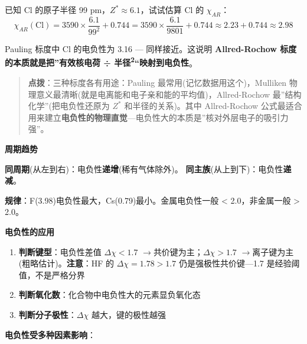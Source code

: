 \documentclass[a4paper,11pt]{ctexart}
\providecommand{\tightlist}{\setlength{\itemsep}{0pt}\setlength{\parskip}{0pt}}
\newcommand{\箭}{\ensuremath{\rightarrow}}
\newcommand{\左箭}{\ensuremath{\leftarrow}}
\newcommand{\上箭}{\ensuremath{\uparrow}}
\newcommand{\下箭}{\ensuremath{\downarrow}}
\newcommand{\衡}{\ensuremath{\rightleftharpoons}}
\newcommand{\双箭}{\ensuremath{\leftrightarrow}}
\newcommand{\约等于}{\ensuremath{\approx}}
\newcommand{\小于等于}{\ensuremath{\leq}}
\newcommand{\大于等于}{\ensuremath{\geq}}
\newcommand{\不等于}{\ensuremath{\neq}}
\newcommand{\西格马}{\ensuremath{\sigma}}
\newcommand{\派}{\ensuremath{\pi}}
\begin{document}
已知 Cl 的原子半径 99 pm，\(Z^* \approx 6.1\)，试试估算 Cl 的 \(\chi_{AR}\)：
\[\chi_{AR}(\mathrm{Cl}) = 3590 \times \frac{6.1}{99^2} + 0.744 = 3590 \times \frac{6.1}{9801} + 0.744 \approx 2.23 + 0.744 \approx 2.98\]

Pauling 标度中 Cl 的电负性为 3.16 --- 同样接近。这说明 \textbf{Allred-Rochow 标度的本质就是把''有效核电荷 ÷ 半径\textsuperscript{2}``映射到电负性}。

\begin{quote}
\textbf{点拨}：三种标度各有用途：Pauling 最常用(记忆数据用这个)，Mulliken 物理意义最清晰(就是电离能和电子亲和能的平均值)，Allred-Rochow 最''结构化学''(把电负性还原为 \(Z^*\) 和半径的关系)。其中 Allred-Rochow 公式最适合用来建立\textbf{电负性的物理直觉}---电负性大的本质是''核对外层电子的吸引力强''。
\end{quote}

\textbf{周期趋势}

\textbf{同周期}(从左到右)：电负性\textbf{递增}(稀有气体除外)。
\textbf{同主族}(从上到下)：电负性\textbf{递减}。

\textbf{规律}：F(3.98)电负性最大，Cs(0.79)最小。金属电负性一般 \textless{} 2.0，非金属一般 \textgreater{} 2.0。

\textbf{电负性的应用}

\begin{enumerate}
\def\labelenumi{\arabic{enumi}.}
\tightlist
\item
  \textbf{判断键型}：电负性差值 \(\Delta\chi < 1.7\) \箭 共价键为主；\(\Delta\chi > 1.7\) \箭 离子键为主(粗略估计)。\textbf{注意}：HF 的 \(\Delta\chi = 1.78 > 1.7\) 仍是强极性共价键---1.7 是经验阈值，不是严格分界
\item
  \textbf{判断氧化数}：化合物中电负性大的元素显负氧化态
\item
  \textbf{判断分子极性}：\(\Delta\chi\) 越大，键的极性越强
\end{enumerate}

\textbf{电负性受多种因素影响}：
\end{document}
